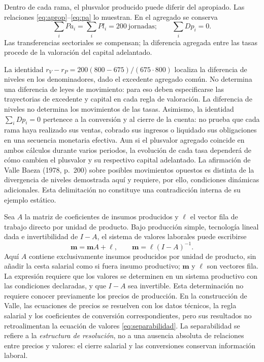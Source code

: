 \documentclass[10pt,twoside]{article}
\begin{document}
Dentro de cada rama, el plusvalor producido puede diferir del apropiado. Las relaciones \eqref{eq:aprop}--\eqref{eq:pa} lo muestran. En el agregado se conserva
\begin{equation}
\sum_i Pa_i=\sum_i Pl_i=200\ \text{jornadas};\qquad
\sum_i Dp_i=0.\label{eq:sumval}
\end{equation}
Las transferencias sectoriales se compensan; la diferencia agregada entre las tasas procede de la valoración del capital adelantado.

La identidad $r_V-r_P=200(800-675)/(675\cdot800)$ localiza la diferencia de niveles en los denominadores, dado el excedente agregado común. No determina una diferencia de leyes de movimiento: para eso deben especificarse las trayectorias de excedente y capital en cada regla de valoración. La diferencia de niveles no determina los movimientos de las tasas. Asimismo, la identidad $\sum_i Dp_i=0$ pertenece a la conversión y al cierre de la cuenta: no prueba que cada rama haya realizado sus ventas, cobrado sus ingresos o liquidado sus obligaciones en una secuencia monetaria efectiva. Aun si el plusvalor agregado coincide en ambos cálculos durante varios periodos, la evolución de cada tasa dependerá de cómo cambien el plusvalor y su respectivo capital adelantado. La afirmación de Valle Baeza (1978, p.~200) sobre posibles movimientos opuestos es distinta de la divergencia de niveles demostrada aquí y requiere, por ello, condiciones dinámicas adicionales. Esta delimitación no constituye una contradicción interna de su ejemplo estático.

Sea $A$ la matriz de coeficientes de insumos producidos y $\boldsymbol\ell$ el vector fila de trabajo directo por unidad de producto. Bajo producción simple, tecnología lineal dada e invertibilidad de $I-A$, el sistema de valores laborales puede escribirse
\begin{equation}
\mathbf m=\mathbf m A+\boldsymbol\ell,
\qquad
\mathbf m=\boldsymbol\ell(I-A)^{-1}.
\label{eq:separabilidad}
\end{equation}
Aquí $A$ contiene exclusivamente insumos producidos por unidad de producto, sin añadir la cesta salarial como si fuera insumo productivo; $\mathbf m$ y $\boldsymbol\ell$ son vectores fila. La expresión requiere que los valores se determinen en un sistema productivo con las condiciones declaradas, y que $I-A$ sea invertible. Esta determinación no requiere conocer previamente los precios de producción. En la construcción de Valle, las ecuaciones de precios se resuelven con los datos técnicos, la regla salarial y los coeficientes de conversión correspondientes, pero sus resultados no retroalimentan la ecuación de valores \eqref{eq:separabilidad}. La separabilidad se refiere a la \emph{estructura de resolución}, no a una ausencia absoluta de relaciones entre precios y valores: el cierre salarial y las conversiones conservan información laboral.
\end{document}
